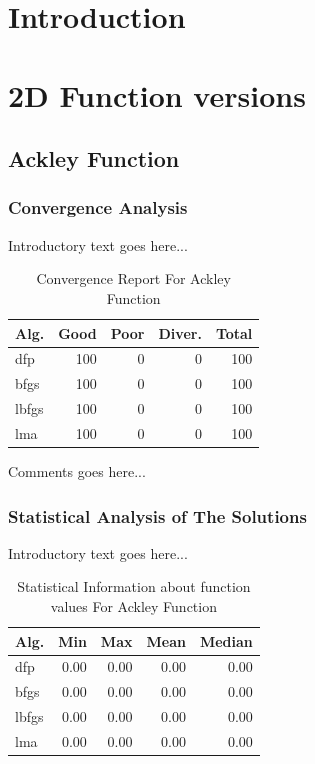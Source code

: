 \documentclass{ieeeaccess}
\begin{document}
\section{Introduction}
\label{sec:introduction}
\section{2D Function versions}
\label{functions2D}

\subsection{Ackley Function}
\label{ackley2D}

\subsubsection{Convergence Analysis}
\label{convergenceackley2D}


Introductory text goes here...
\begin{table}
\centering
\caption{Convergence Report For Ackley Function}
\label{convergence:ackley}
\begin{tabular}{lrrrr}
\toprule
 Alg. &  Good &  Poor &  Diver. &  Total \\
\midrule
  dfp &   100 &     0 &       0 &    100 \\
 bfgs &   100 &     0 &       0 &    100 \\
lbfgs &   100 &     0 &       0 &    100 \\
  lma &   100 &     0 &       0 &    100 \\
\bottomrule
\end{tabular}
\end{table}


Comments goes here...
\subsubsection{Statistical Analysis of The Solutions}
\label{statisticalanalysisackley2D}


Introductory text goes here...
\begin{table}
\centering
\caption{Statistical Information about function values For Ackley Function}
\label{function_values:ackley}
\begin{tabular}{lrrrr}
\toprule
 Alg. &  Min &  Max &  Mean &  Median \\
\midrule
  dfp & 0.00 & 0.00 &  0.00 &    0.00 \\
 bfgs & 0.00 & 0.00 &  0.00 &    0.00 \\
lbfgs & 0.00 & 0.00 &  0.00 &    0.00 \\
  lma & 0.00 & 0.00 &  0.00 &    0.00 \\
\bottomrule
\end{tabular}
\end{table}
\end{document}
